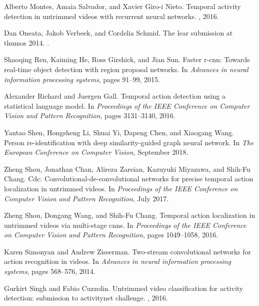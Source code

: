 \documentclass[10pt,twocolumn,letterpaper]{article}
\begin{document}
\begin{thebibliography}{10}
	Alberto Montes, Amaia Salvador, and Xavier Giro-i Nieto.
	\newblock Temporal activity detection in untrimmed videos with recurrent neural
	networks.
	, 2016.
	
	Dan Oneata, Jakob Verbeek, and Cordelia Schmid.
	\newblock The lear submission at thumos 2014.
	.
	
	Shaoqing Ren, Kaiming He, Ross Girshick, and Jian Sun.
	\newblock Faster r-cnn: Towards real-time object detection with region proposal
	networks.
	\newblock In {\em Advances in neural information processing systems}, pages
	91--99, 2015.
	
	Alexander Richard and Juergen Gall.
	\newblock Temporal action detection using a statistical language model.
	\newblock In {\em Proceedings of the IEEE Conference on Computer Vision and
		Pattern Recognition}, pages 3131--3140, 2016.
	
	Yantao Shen, Hongsheng Li, Shuai Yi, Dapeng Chen, and Xiaogang Wang.
	\newblock Person re-identification with deep similarity-guided graph neural
	network.
	\newblock In {\em The European Conference on Computer Vision}, September 2018.
	
	Zheng Shou, Jonathan Chan, Alireza Zareian, Kazuyuki Miyazawa, and Shih-Fu
	Chang.
	\newblock Cdc: Convolutional-de-convolutional networks for precise temporal
	action localization in untrimmed videos.
	\newblock In {\em Proceedings of the IEEE Conference on Computer Vision and
		Pattern Recognition}, July 2017.
	
	Zheng Shou, Dongang Wang, and Shih-Fu Chang.
	\newblock Temporal action localization in untrimmed videos via multi-stage
	cnns.
	\newblock In {\em Proceedings of the IEEE Conference on Computer Vision and
		Pattern Recognition}, pages 1049--1058, 2016.
	
	Karen Simonyan and Andrew Zisserman.
	\newblock Two-stream convolutional networks for action recognition in videos.
	\newblock In {\em Advances in neural information processing systems}, pages
	568--576, 2014.
	
	Gurkirt Singh and Fabio Cuzzolin.
	\newblock Untrimmed video classification for activity detection: submission to
	activitynet challenge.
	, 2016.
	

\end{thebibliography}
\end{document}
